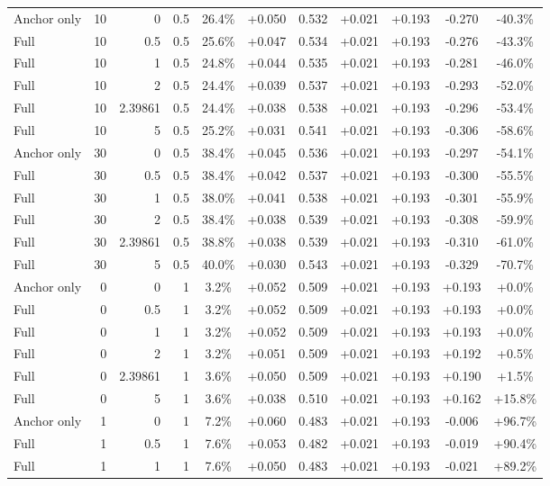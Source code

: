 \begin{table}[htbp]
\begin{tabular}{lrrrccccccc}
Anchor only & 10 & 0 & 0.5 & 26.4\% & +0.050 & 0.532 & +0.021 & +0.193 & -0.270 & -40.3\% \\
Full & 10 & 0.5 & 0.5 & 25.6\% & +0.047 & 0.534 & +0.021 & +0.193 & -0.276 & -43.3\% \\
Full & 10 & 1 & 0.5 & 24.8\% & +0.044 & 0.535 & +0.021 & +0.193 & -0.281 & -46.0\% \\
Full & 10 & 2 & 0.5 & 24.4\% & +0.039 & 0.537 & +0.021 & +0.193 & -0.293 & -52.0\% \\
Full & 10 & 2.39861 & 0.5 & 24.4\% & +0.038 & 0.538 & +0.021 & +0.193 & -0.296 & -53.4\% \\
Full & 10 & 5 & 0.5 & 25.2\% & +0.031 & 0.541 & +0.021 & +0.193 & -0.306 & -58.6\% \\
Anchor only & 30 & 0 & 0.5 & 38.4\% & +0.045 & 0.536 & +0.021 & +0.193 & -0.297 & -54.1\% \\
Full & 30 & 0.5 & 0.5 & 38.4\% & +0.042 & 0.537 & +0.021 & +0.193 & -0.300 & -55.5\% \\
Full & 30 & 1 & 0.5 & 38.0\% & +0.041 & 0.538 & +0.021 & +0.193 & -0.301 & -55.9\% \\
Full & 30 & 2 & 0.5 & 38.4\% & +0.038 & 0.539 & +0.021 & +0.193 & -0.308 & -59.9\% \\
Full & 30 & 2.39861 & 0.5 & 38.8\% & +0.038 & 0.539 & +0.021 & +0.193 & -0.310 & -61.0\% \\
Full & 30 & 5 & 0.5 & 40.0\% & +0.030 & 0.543 & +0.021 & +0.193 & -0.329 & -70.7\% \\
Anchor only & 0 & 0 & 1 & 3.2\% & +0.052 & 0.509 & +0.021 & +0.193 & +0.193 & +0.0\% \\
Full & 0 & 0.5 & 1 & 3.2\% & +0.052 & 0.509 & +0.021 & +0.193 & +0.193 & +0.0\% \\
Full & 0 & 1 & 1 & 3.2\% & +0.052 & 0.509 & +0.021 & +0.193 & +0.193 & +0.0\% \\
Full & 0 & 2 & 1 & 3.2\% & +0.051 & 0.509 & +0.021 & +0.193 & +0.192 & +0.5\% \\
Full & 0 & 2.39861 & 1 & 3.6\% & +0.050 & 0.509 & +0.021 & +0.193 & +0.190 & +1.5\% \\
Full & 0 & 5 & 1 & 3.6\% & +0.038 & 0.510 & +0.021 & +0.193 & +0.162 & +15.8\% \\
Anchor only & 1 & 0 & 1 & 7.2\% & +0.060 & 0.483 & +0.021 & +0.193 & -0.006 & +96.7\% \\
Full & 1 & 0.5 & 1 & 7.6\% & +0.053 & 0.482 & +0.021 & +0.193 & -0.019 & +90.4\% \\
Full & 1 & 1 & 1 & 7.6\% & +0.050 & 0.483 & +0.021 & +0.193 & -0.021 & +89.2\% \\

\end{tabular}
\end{table}
